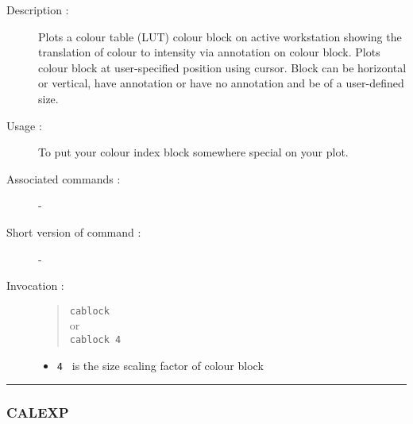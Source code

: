 \begin{description}

\item[Description :] Plots a colour table (LUT) colour block on active
workstation showing the translation of colour to intensity via annotation
on colour block.  Plots colour block at user-specified position using
cursor. Block can be horizontal or vertical, have annotation or have no
annotation and be of a user-defined size. 

\item[Usage :] To put your colour index block somewhere special on your plot. 

\item[Associated commands :] -
\item[Short version of command :] -
\item[Invocation :]

\begin{quote}{\tt  cablock }\\
or \\
{\tt  cablock 4 }
\end{quote}

\begin{itemize}

\item {\tt 4 } is the size scaling factor of colour block

\end{itemize}
\end{description}

\hrule 
\subsubsection*{\label{CALEXP}CALEXP}

